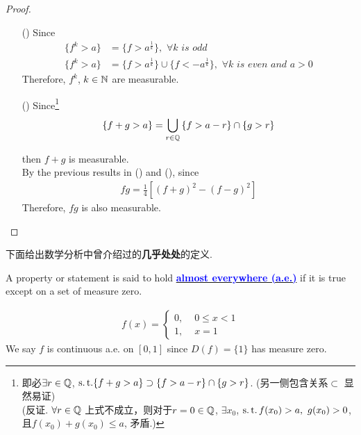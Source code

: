 \begin{enumerate}
		\vspace{2em}
		\begin{proof}
			\begin{enumerate}
				\item[(\rmnum{1})]Since
				\begin{align}
					\{ f^k > a \} &= \{ f > a^{\frac{1}{k}} \} , \,\, \forall k \,\, is \,\, odd \\
					\{ f^k > a \} &= \{ f > a^{\frac{1}{k}} \} \cup \{ f < -a^{\frac{1}{k}} \} , \,\, \forall k \,\, is \,\, even \,\, and \,\, a > 0
				\end{align}
				Therefore, $f^k$, $k \in \mathbb{N}$ are measurable.
				
				\item[(\rmnum{2})]Since\footnote{即必$\exists r \in \mathbb{Q}$, $\operatorname{s.t.} \{ f + g > a \} \supset \{ f > a - r \} \cap \{ g > r \}$. (另一侧包含关系$\subset$ 显然易证)\\
				(反证. $\forall r \in \mathbb{Q}$ 上式不成立，则对于$r = 0 \in \mathbb{Q}$, $\exists x_0$, $\operatorname{s.t.} f(x_0) > a , \,\, g(x_0) > 0$, 且$f(x_0) + g(x_0) \leq a$, 矛盾.)}
				\begin{align}
					\{ f + g > a \} = \bigcup_{r \in \mathbb{Q}}{\{ f > a - r \} \cap \{ g > r \}}
				\end{align}
				
				\newpage
				then $f + g$ is measurable.\\
				By the previous results in () and (), since
				\begin{align}
					fg = \frac{1}{4} [ (f + g)^2 - (f - g)^2 ]
				\end{align}
				Therefore, $fg$ is also measurable.
			\end{enumerate}
		\end{proof}
	\end{enumerate}
	
	\vspace{2em}
	下面给出数学分析中曾介绍过的\textbf{几乎处处}的定义.
	\begin{defn}\label{def 2.1.2}
		A property or statement is said to hold \underline{\textcolor{blue}{\textbf{almost everywhere (a.e.)}}} if it is true except on a set of measure zero.
		
		\begin{example}\label{ex 2.1.2}
			\begin{align}
				f(x) = 
				\begin{cases}
					0 , \,\, &0 \leq x < 1 \\
					1 , &x = 1
				\end{cases}
			\end{align}
			We say $f$ is continuous a.e. on $[0 , 1]$ since $D(f) = \{ 1 \}$ has measure zero.
		\end{example}
	\end{defn}

